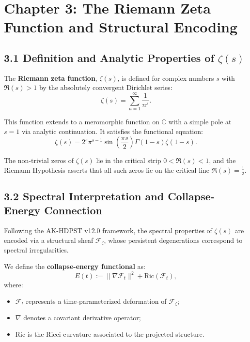 \documentclass[11pt]{article}
\begin{document}
\section{Chapter 3: The Riemann Zeta Function and Structural Encoding}

\subsection*{3.1 Definition and Analytic Properties of $\zeta(s)$}

The \textbf{Riemann zeta function}, $\zeta(s)$, is defined for complex numbers $s$ with $\Re(s) > 1$ by the absolutely convergent Dirichlet series:
\[
\zeta(s) = \sum_{n=1}^{\infty} \frac{1}{n^s}.
\]

This function extends to a meromorphic function on $\mathbb{C}$ with a simple pole at $s = 1$ via analytic continuation. It satisfies the functional equation:
\[
\zeta(s) = 2^s \pi^{s-1} \sin\left( \frac{\pi s}{2} \right) \Gamma(1 - s) \zeta(1 - s).
\]

The non-trivial zeros of $\zeta(s)$ lie in the critical strip $0 < \Re(s) < 1$, and the Riemann Hypothesis asserts that all such zeros lie on the critical line $\Re(s) = \tfrac{1}{2}$.

\subsection*{3.2 Spectral Interpretation and Collapse-Energy Connection}

Following the AK-HDPST v12.0 framework, the spectral properties of $\zeta(s)$ are encoded via a structural sheaf $\mathcal{F}_{\zeta}$, whose persistent degenerations correspond to spectral irregularities.

We define the \textbf{collapse-energy functional} as:
\[
E(t) := \| \nabla \mathcal{F}_t \|^2 + \mathrm{Ric}(\mathcal{F}_t),
\]
where:
\begin{itemize}
    \item $\mathcal{F}_t$ represents a time-parameterized deformation of $\mathcal{F}_{\zeta}$;
    \item $\nabla$ denotes a covariant derivative operator;
    \item $\mathrm{Ric}$ is the Ricci curvature associated to the projected structure.
\end{itemize}
\end{document}
